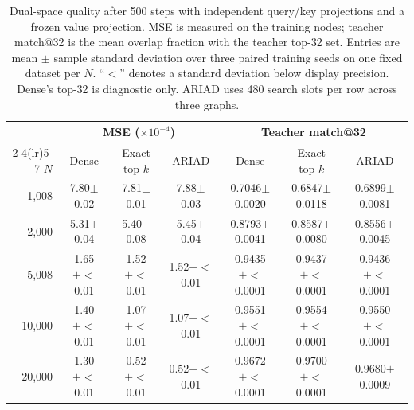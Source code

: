 \begin{table}[t]
\centering
\caption{Dual-space quality after 500 steps with independent query/key projections and a frozen value projection. MSE is measured on the training nodes; teacher match@32 is the mean overlap fraction with the teacher top-32 set. Entries are mean $\pm$ sample standard deviation over three paired training seeds on one fixed dataset per $N$. ``$<$'' denotes a standard deviation below display precision. Dense's top-32 is diagnostic only. ARIAD uses 480 search slots per row across three graphs.}
\label{tab:dual-quality}
\footnotesize
\setlength{\tabcolsep}{3.5pt}
\begin{tabular}{r ccc ccc}
\toprule
 & \multicolumn{3}{c}{MSE ($\times10^{-4}$)} & \multicolumn{3}{c}{Teacher match@32} \\
\cmidrule(lr){2-4}\cmidrule(lr){5-7}
$N$ & Dense & Exact top-$k$ & ARIAD & Dense & Exact top-$k$ & ARIAD \\
\midrule
1,008 & 7.80$\pm$0.02 & 7.81$\pm$0.01 & 7.88$\pm$0.03 & 0.7046$\pm$0.0020 & 0.6847$\pm$0.0118 & 0.6899$\pm$0.0081 \\
2,000 & 5.31$\pm$0.04 & 5.40$\pm$0.08 & 5.45$\pm$0.04 & 0.8793$\pm$0.0041 & 0.8587$\pm$0.0080 & 0.8556$\pm$0.0045 \\
5,008 & 1.65$\pm{<}$0.01 & 1.52$\pm{<}$0.01 & 1.52$\pm{<}$0.01 & 0.9435$\pm{<}$0.0001 & 0.9437$\pm{<}$0.0001 & 0.9436$\pm{<}$0.0001 \\
10,000 & 1.40$\pm{<}$0.01 & 1.07$\pm{<}$0.01 & 1.07$\pm{<}$0.01 & 0.9551$\pm{<}$0.0001 & 0.9554$\pm{<}$0.0001 & 0.9550$\pm{<}$0.0001 \\
20,000 & 1.30$\pm{<}$0.01 & 0.52$\pm{<}$0.01 & 0.52$\pm{<}$0.01 & 0.9672$\pm{<}$0.0001 & 0.9700$\pm{<}$0.0001 & 0.9680$\pm$0.0009 \\
\bottomrule
\end{tabular}

\end{table}
